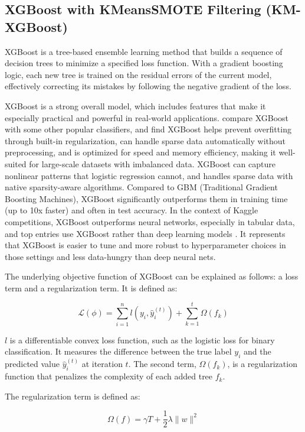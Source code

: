 \subsection{XGBoost with KMeansSMOTE Filtering (KM-XGBoost)}
XGBoost is a tree-based ensemble learning method that builds a sequence of decision trees to minimize a specified loss function. With a gradient boosting logic, each new tree is trained on the residual errors of the current model, effectively correcting its mistakes by following the negative gradient of the loss. 

XGBoost is a strong overall model, which includes features that make it especially practical and powerful in real-world applications. \cite{XGBoost_2016} compare XGBoost with some other popular classifiers, and find XGBoost helps prevent overfitting through built-in regularization, can handle sparse data automatically without preprocessing, and is optimized for speed and memory efficiency, making it well-suited for large-scale datasets with imbalanced data. XGBoost can capture nonlinear patterns that logistic regression cannot, and handles sparse data with native sparsity-aware algorithms. Compared to GBM (Traditional Gradient Boosting Machines), XGBoost significantly outperforms them in training time (up to 10x faster) and often in test accuracy. In the context of Kaggle competitions, XGBoost outperforms neural networks, especially in tabular data, and top entries use XGBoost rather than deep learning models \citep{XGBoost_2016}. It represents that XGBoost is easier to tune and more robust to hyperparameter choices in those settings and less data-hungry than deep neural nets.

The underlying objective function of XGBoost can be explained as follows: a loss term and a regularization term. It is defined as:

\begin{equation}
\mathcal{L}(\phi) = \sum_{i=1}^{n} l(y_i, \hat{y}_i^{(t)}) + \sum_{k=1}^{t} \Omega(f_k)
\end{equation}

$l$ is a differentiable convex loss function, such as the logistic loss for binary classification. It measures the difference between the true label $y_i$ and the predicted value $\hat{y}_i^{(t)}$ at iteration $t$. The second term, $\Omega(f_k)$, is a regularization function that penalizes the complexity of each added tree $f_k$.

The regularization term is defined as:

\begin{equation}
\Omega(f) = \gamma T + \frac{1}{2} \lambda \|w\|^2
\end{equation}

